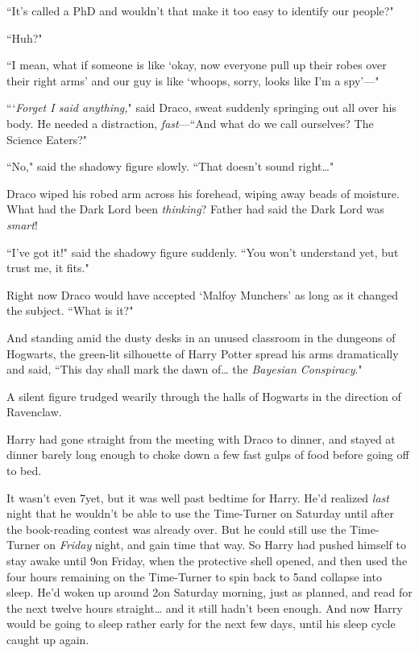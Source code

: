 ``It's called a PhD and wouldn't that make it too easy to identify our people?"

``Huh?"

``I mean, what if someone is like `okay, now everyone pull up their robes over their right arms' and our guy is like `whoops, sorry, looks like I'm a spy'---"

```\emph{Forget I said anything,}" said Draco, sweat suddenly springing out all over his body. He needed a distraction, \emph{fast}---``And what do we call ourselves? The Science Eaters?"

``No," said the shadowy figure slowly. ``That doesn't sound right{\ldots}"

Draco wiped his robed arm across his forehead, wiping away beads of moisture. What had the Dark Lord been \emph{thinking}? Father had said the Dark Lord was \emph{smart}!

``I've got it!" said the shadowy figure suddenly. ``You won't understand yet, but trust me, it fits."

Right now Draco would have accepted `Malfoy Munchers' as long as it changed the subject. ``What is it?"

And standing amid the dusty desks in an unused classroom in the dungeons of Hogwarts, the green-lit silhouette of Harry Potter spread his arms dramatically and said, ``This day shall mark the dawn of{\ldots} the \emph{Bayesian Conspiracy}."

\later

A silent figure trudged wearily through the halls of Hogwarts in the direction of Ravenclaw.

Harry had gone straight from the meeting with Draco to dinner, and stayed at dinner barely long enough to choke down a few fast gulps of food before going off to bed.

It wasn't even 7\pm yet, but it was well past bedtime for Harry. He'd realized \emph{last} night that he wouldn't be able to use the Time-Turner on Saturday until after the book-reading contest was already over. But he could still use the Time-Turner on \emph{Friday} night, and gain time that way. So Harry had pushed himself to stay awake until 9\pm on Friday, when the protective shell opened, and then used the four hours remaining on the Time-Turner to spin back to 5\pm and collapse into sleep. He'd woken up around 2\am on Saturday morning, just as planned, and read for the next twelve hours straight{\ldots} and it still hadn't been enough. And now Harry would be going to sleep rather early for the next few days, until his sleep cycle caught up again.

